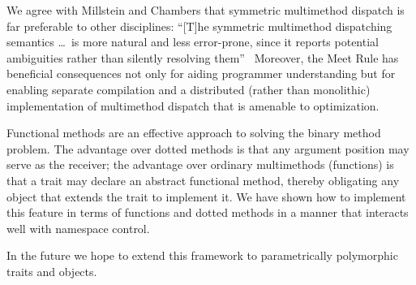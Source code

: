 We agree with Millstein and Chambers that symmetric multimethod dispatch
is far preferable to other disciplines: ``[T]he symmetric multimethod dispatching
semantics \ldots\ is more natural and less error-prone, since it reports potential
ambiguities rather than silently resolving them''~\cite[\S 4.1]{MODULAR-STATICALLY-TYPED-MULTIMETHODS}
Moreover, the Meet Rule has beneficial consequences
not only for aiding programmer understanding but for enabling separate
compilation and a distributed (rather than monolithic) implementation of multimethod dispatch
that is amenable to optimization.

Functional methods are an effective approach to
solving the binary method problem.  The advantage over dotted methods
is that any argument position may serve as the receiver; the advantage
over ordinary multimethods (functions) is that a trait may declare an
abstract functional method, thereby obligating any object that extends
the trait to implement it.  We have shown how to implement
this feature in terms of functions and dotted methods in a manner
that interacts well with namespace control.

In the future we hope to extend this framework to parametrically polymorphic
traits and objects.


